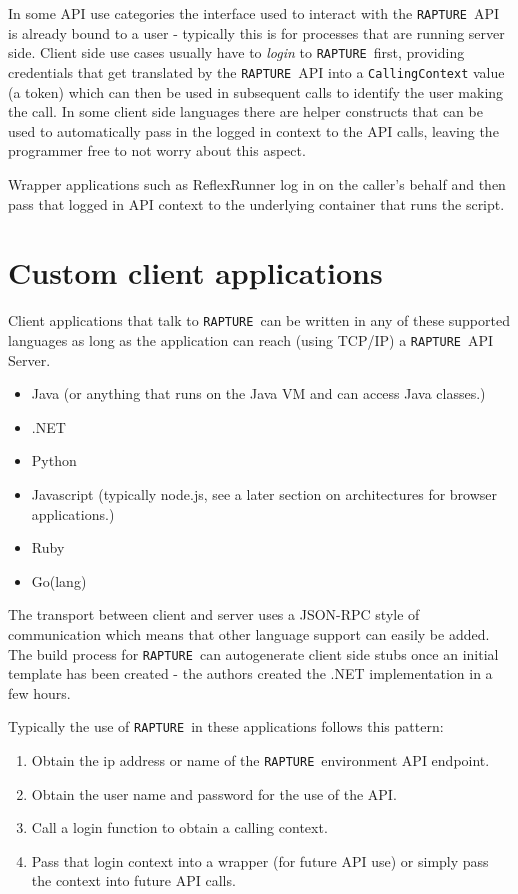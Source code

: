 \documentclass[12pt,twoside,a4paper]{book}
\newcommand{\Rapture}{\Verb+RAPTURE+~}
\begin{document}
In some API use categories the interface used to interact with the \Rapture API
is already bound to a user - typically this is for processes that are running
server side. Client side use cases usually have to \emph{login} to \Rapture first,
providing credentials that get translated by the \Rapture API into a \verb+CallingContext+
value (a token) which can then be used in subsequent calls to identify the user
making the call. In some client side languages there are helper constructs that
can be used to automatically pass in the logged in context to the API calls,
leaving the programmer free to not worry about this aspect.

Wrapper applications such as ReflexRunner log in on the caller's behalf and then
pass that logged in API context to the underlying container that runs the script.

\section{Custom client applications}

Client applications that talk to \Rapture can be written in any of these supported languages as
long as the application can reach (using TCP/IP) a \Rapture API Server.

\begin{itemize}
  \item{Java (or anything that runs on the Java VM and can access Java classes.)}
  \item{.NET}
  \item{Python}
  \item{Javascript (typically node.js, see a later section on architectures for browser applications.)}
  \item{Ruby}
  \item{Go(lang)}
\end{itemize}

The transport between client and server uses a JSON-RPC style of communication which
means that other language support can easily be added. The build process for
\Rapture can autogenerate client side stubs once an initial template has been
created - the authors created the .NET implementation in a few hours.

Typically the use of \Rapture in these applications follows this pattern:

\begin{enumerate}
  \item{Obtain the ip address or name of the \Rapture environment API endpoint.}
  \item{Obtain the user name and password for the use of the API.}
  \item{Call a login function to obtain a calling context.}
  \item{Pass that login context into a wrapper (for future API use) or simply pass the context into future API calls.}
\end{enumerate}
\end{document}
